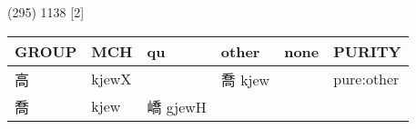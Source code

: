 \documentclass[14pt,a4paper]{scrartcl}
\begin{document}
(295) 1138 {[}2{]}

\begin{longtable}[c]{@{}llllll@{}}
\toprule
\begin{minipage}[b]{0.14\columnwidth}\raggedright\strut
GROUP
\strut\end{minipage} &
\begin{minipage}[b]{0.14\columnwidth}\raggedright\strut
MCH
\strut\end{minipage} &
\begin{minipage}[b]{0.14\columnwidth}\raggedright\strut
qu
\strut\end{minipage} &
\begin{minipage}[b]{0.14\columnwidth}\raggedright\strut
other
\strut\end{minipage} &
\begin{minipage}[b]{0.14\columnwidth}\raggedright\strut
none
\strut\end{minipage} &
\begin{minipage}[b]{0.14\columnwidth}\raggedright\strut
PURITY
\strut\end{minipage}\tabularnewline
\midrule
\endhead
\begin{minipage}[t]{0.14\columnwidth}\raggedright\strut
高
\strut\end{minipage} &
\begin{minipage}[t]{0.14\columnwidth}\raggedright\strut
kjewX
\strut\end{minipage} &
\begin{minipage}[t]{0.14\columnwidth}\raggedright\strut
\strut\end{minipage} &
\begin{minipage}[t]{0.14\columnwidth}\raggedright\strut
喬 kjew
\strut\end{minipage} &
\begin{minipage}[t]{0.14\columnwidth}\raggedright\strut
\strut\end{minipage} &
\begin{minipage}[t]{0.14\columnwidth}\raggedright\strut
pure:other
\strut\end{minipage}\tabularnewline
\begin{minipage}[t]{0.14\columnwidth}\raggedright\strut
喬
\strut\end{minipage} &
\begin{minipage}[t]{0.14\columnwidth}\raggedright\strut
kjew
\strut\end{minipage} &
\begin{minipage}[t]{0.14\columnwidth}\raggedright\strut
嶠 gjewH
\strut\end{minipage} &

\end{longtable}
\end{document}
